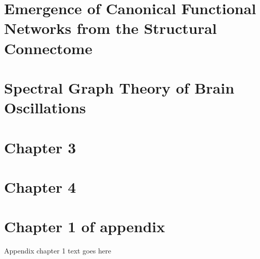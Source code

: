\documentclass[phd,tocprelim]{cornell}
\begin{document}
\chapter{Emergence of Canonical Functional Networks from the Structural Connectome}


\chapter{Spectral Graph Theory of Brain Oscillations}










\chapter{Chapter 3}

\chapter{Chapter 4}

\appendix
\chapter{Chapter 1 of appendix}
Appendix chapter 1 text goes here


\end{document}
